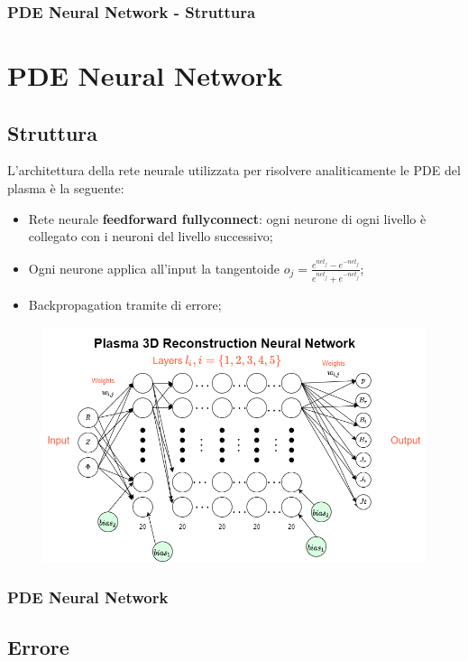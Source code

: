 \documentclass{beamer}
\begin{document}
\begin{frame}
	\frametitle{PDE Neural Network - Struttura} %
	\section{PDE Neural Network}
	\subsection{Struttura}
	L'architettura della rete neurale utilizzata per risolvere analiticamente le PDE del plasma è la seguente:
	\begin{itemize}
		\item Rete neurale \textbf{feedforward fullyconnect}: ogni neurone di ogni livello è collegato con i neuroni del livello successivo;
		\item Ogni neurone applica all'input la tangentoide \(o_{j}=\frac{e^{net_{j}}-e^{-net_{j}}}{e^{net_{j}}+e^{-net_{j}}}\);
		\item Backpropagation tramite di errore;
	\end{itemize}
	\begin{figure}
		\includegraphics[scale=0.3]{reteOrganizzazione.png}
	\end{figure}

\end{frame}
\begin{frame}
	\frametitle{PDE Neural Network}
	\subsection{Errore}
	\vspace{-0.1cm}
		\begin{figure}
		\end{figure}
\end{frame}
\end{document}
